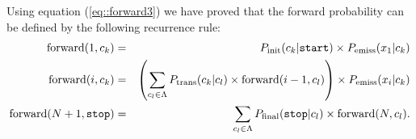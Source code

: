  Using equation (\ref{eq::forward3}) we have proved that  the forward probability can be defined by the
following recurrence rule: 
\begin{eqnarray}
\mathrm{forward}(1, c_k)&=& P_{\mathrm{init}}(c_k|\text{\tt start}) \times 
P_{\mathrm{emiss}}(x_1 | c_k)
 \\
 \mathrm{forward}(i, c_k) &=& \left( \displaystyle \sum_{c_l \in \Lambda} P_{\mathrm{trans}}(c_k | c_l) \times \mathrm{forward}(i-1, c_l) \right) \times P_{\mathrm{emiss}}(x_i | c_k)  \label{forwardRecursion}
 \\
  \mathrm{forward}(N+1, \text{\tt stop}) &=& \sum_{c_l \in \Lambda} P_{\mathrm{final}}(\text{\tt stop} | c_l) \times \mathrm{forward}(N, c_l).
\end{eqnarray}

%
%


